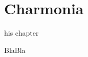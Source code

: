 \let\textcircled=\pgftextcircled
\chapter{Charmonia} \label{sec:Charmonia}

his chapter

BlaBla









\clearpage
